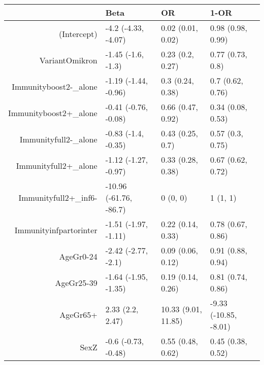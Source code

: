 \begin{table}[ht]
\centering
\begin{tabular}{rlll}
  \hline
 & Beta & OR & 1-OR \\ 
  \hline
(Intercept) & -4.2 (-4.33, -4.07) & 0.02 (0.01, 0.02) & 0.98 (0.98, 0.99) \\ 
  VariantOmikron & -1.45 (-1.6, -1.3) & 0.23 (0.2, 0.27) & 0.77 (0.73, 0.8) \\ 
  Immunityboost2-\_alone & -1.19 (-1.44, -0.96) & 0.3 (0.24, 0.38) & 0.7 (0.62, 0.76) \\ 
  Immunityboost2+\_alone & -0.41 (-0.76, -0.08) & 0.66 (0.47, 0.92) & 0.34 (0.08, 0.53) \\ 
  Immunityfull2-\_alone & -0.83 (-1.4, -0.35) & 0.43 (0.25, 0.7) & 0.57 (0.3, 0.75) \\ 
  Immunityfull2+\_alone & -1.12 (-1.27, -0.97) & 0.33 (0.28, 0.38) & 0.67 (0.62, 0.72) \\ 
  Immunityfull2+\_inf6- & -10.96 (-61.76, -86.7) & 0 (0, 0) & 1 (1, 1) \\ 
  Immunityinfpartorinter & -1.51 (-1.97, -1.11) & 0.22 (0.14, 0.33) & 0.78 (0.67, 0.86) \\ 
  AgeGr0-24 & -2.42 (-2.77, -2.1) & 0.09 (0.06, 0.12) & 0.91 (0.88, 0.94) \\ 
  AgeGr25-39 & -1.64 (-1.95, -1.35) & 0.19 (0.14, 0.26) & 0.81 (0.74, 0.86) \\ 
  AgeGr65+ & 2.33 (2.2, 2.47) & 10.33 (9.01, 11.85) & -9.33 (-10.85, -8.01) \\ 
  SexZ & -0.6 (-0.73, -0.48) & 0.55 (0.48, 0.62) & 0.45 (0.38, 0.52) \\ 
   \hline
\end{tabular}
\end{table}
